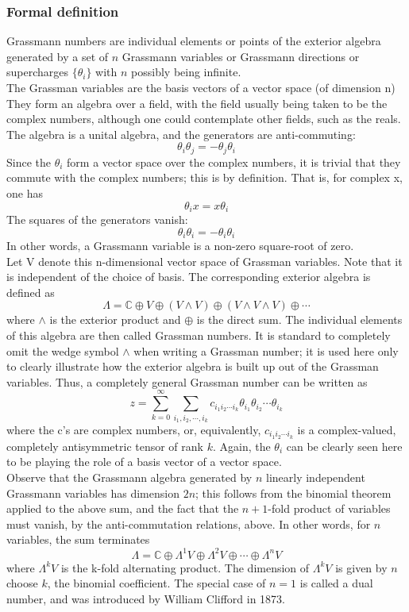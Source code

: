 \documentclass[cyan]{elegantnote}
\begin{document}
\subsubsection{Formal definition}
Grassmann numbers are individual elements or points of the exterior algebra generated by a set of $n$ Grassmann variables or Grassmann directions or supercharges $\{\theta _{i}\}$ with $n$ possibly being infinite.
\\
The Grassman variables are the basis vectors of a vector space (of dimension n) They form an algebra over a field, with the field usually being taken to be the complex numbers, although one could contemplate other fields, such as the reals. The algebra is a unital algebra, and the generators are anti-commuting:
\[\theta _{i}\theta _{j}=-\theta _{j}\theta _{i}\]
Since the $\theta _{i}$ form a vector space over the complex numbers, it is trivial that they commute with the complex numbers; this is by definition. That is, for complex x, one has
\[\theta _{i}x=x\theta _{i}\]
The squares of the generators vanish:
\[\theta_i \theta_i = -\theta_i \theta_i\]
In other words, a Grassmann variable is a non-zero square-root of zero.
\\
Let V denote this n-dimensional vector space of Grassman variables. Note that it is independent of the choice of basis. The corresponding exterior algebra is defined as
\[\Lambda =\mathbb {C} \oplus V\oplus \left(V\wedge V\right)\oplus \left(V\wedge V\wedge V\right)\oplus \cdots\]
where $\wedge$ is the exterior product and $\oplus$ is the direct sum. The individual elements of this algebra are then called Grassman numbers. It is standard to completely omit the wedge symbol $\wedge$ when writing a Grassman number; it is used here only to clearly illustrate how the exterior algebra is built up out of the Grassman variables. Thus, a completely general Grassman number can be written as
\[z=\sum _{k=0}^{\infty }\sum _{i_{1},i_{2},\cdots ,i_{k}}c_{i_{1}i_{2}\cdots i_{k}}\theta _{i_{1}}\theta _{i_{2}}\cdots \theta _{i_{k}}\]
where the c's are complex numbers, or, equivalently, $c_{i_{1}i_{2}\cdots i_{k}}$ is a complex-valued, completely antisymmetric tensor of rank $k$. Again, the $\theta _{i}$ can be clearly seen here to be playing the role of a basis vector of a vector space.
\\
Observe that the Grassmann algebra generated by $n$ linearly independent Grassmann variables has dimension $2n$; this follows from the binomial theorem applied to the above sum, and the fact that the $n+1$-fold product of variables must vanish, by the anti-commutation relations, above. In other words, for $n$ variables, the sum terminates
\[\Lambda =\mathbb {C} \oplus \Lambda ^{1}V\oplus \Lambda ^{2}V\oplus \cdots \oplus \Lambda ^{n}V\]
where $\Lambda ^{k}V$ is the k-fold alternating product. The dimension of  $\Lambda ^{k}V$ is given by $n$ choose $k$, the binomial coefficient. The special case of $n=1$ is called a dual number, and was introduced by William Clifford in 1873.
\end{document}
